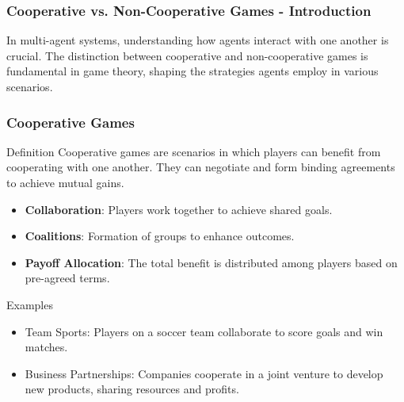 \documentclass[aspectratio=169]{beamer}
\begin{document}
\begin{frame}[fragile]
    \frametitle{Cooperative vs. Non-Cooperative Games - Introduction}
    In multi-agent systems, understanding how agents interact with one another is crucial. The distinction between cooperative and non-cooperative games is fundamental in game theory, shaping the strategies agents employ in various scenarios.
\end{frame}

\begin{frame}[fragile]
    \frametitle{Cooperative Games}
    
    \begin{block}{Definition}
        Cooperative games are scenarios in which players can benefit from cooperating with one another. They can negotiate and form binding agreements to achieve mutual gains.
    \end{block}
    
    \begin{itemize}
        \item \textbf{Collaboration}: Players work together to achieve shared goals.
        \item \textbf{Coalitions}: Formation of groups to enhance outcomes.
        \item \textbf{Payoff Allocation}: The total benefit is distributed among players based on pre-agreed terms.
    \end{itemize}

    \begin{block}{Examples}
        \begin{itemize}
            \item Team Sports: Players on a soccer team collaborate to score goals and win matches.
            \item Business Partnerships: Companies cooperate in a joint venture to develop new products, sharing resources and profits.
        \end{itemize}
    \end{block}
\end{frame}
\end{document}
